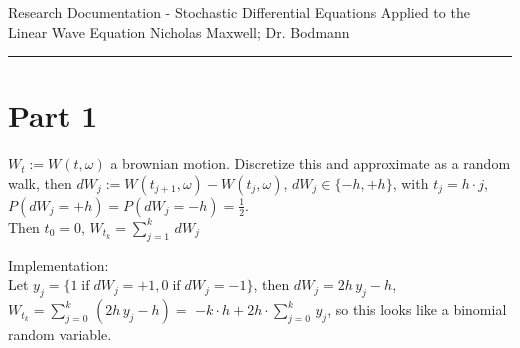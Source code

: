 \documentclass[12pt]{article}
\newcommand{\IF}[0] { \; \textrm{if} \; }
\begin{document}
\begin{flushleft}
Research Documentation - Stochastic Differential Equations Applied to the Linear Wave Equation
Nicholas Maxwell; Dr. Bodmann\\
\end{flushleft}

\begin{flushleft}
\addvspace{5pt} \hrule
\end{flushleft}	



\section*{Part 1}

\begin{flushleft}
$W_t := W(t,\omega)$ a brownian motion. Discretize this and approximate as a random walk, then $dW_j := W(t_{j+1},\omega)-W(t_{j},\omega)$, $dW_j \in \{-h, +h\}$, with $t_j = h \cdot j$, $P(dW_j = +h) = P(dW_j = -h) = \frac{1}{2}$. \\
Then $t_0 = 0$, $W_{t_k} = \sum_{j=1}^{k} \, dW_j$
\end{flushleft}

\begin{flushleft}
Implementation:\\
Let $y_j = \{ 1 \IF dW_j = +1, 0 \IF dW_j = -1 \}$, then $dW_j = 2h\, y_j-h$, $W_{t_k} = \sum_{j=0}^{k} \, (2h\, y_j-h) =$ $ -k \cdot h + 2h \cdot \sum_{j=0}^{k} \, y_j$, so this looks like a binomial random variable.
\end{flushleft}
\end{document}
